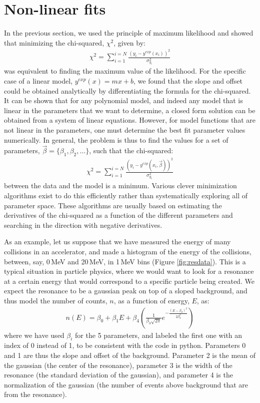 \section{Non-linear fits}
In the previous section, we used the principle of maximum likelihood and showed that minimizing the chi-squared, $\chi^2$, given by:
\begin{align}
\chi^2=\sum_{i=1}^{i=N}\frac{(y_i-y^{exp}(x_i))^2}{\sigma_{y_i}^2}
\end{align}
was equivalent to finding the maximum value of the likelihood. For the specific case of a linear  model, $y^{exp}(x)=mx+b$, we found that the slope and offset could be obtained analytically by differentiating the formula for the chi-squared. It can be shown that for any polynomial model, and indeed any model that is linear in the parameters that we want to determine, a closed form solution can be obtained from a system of linear equations. However, for model functions that are not linear in the parameters, one must determine the best fit parameter values numerically. In general, the problem is thus to find the values for a set of parameters, $\vec\beta=\{\beta_1, \beta_2,\dots\}$, such that the chi-squared:
\begin{align}
\chi^2=\sum_{i=1}^{i=N}\frac{(y_i-y^{exp}(x_i,\vec\beta))^2}{\sigma_{y_i}^2}
\end{align}
between the data and the model is a minimum. Various clever minimization algorithms exist to do this efficiently rather than systematically exploring all of parameter space. These algorithms are usually based on estimating the derivatives of the chi-squared as a function of the different parameters and searching in the direction with negative derivatives.

As an example, let us suppose that we have measured the energy of many collisions in an accelerator, and made a histogram of the energy of the collisions, between, say, 0\,MeV and 20\,MeV, in 1\,MeV bins (Figure \ref{fig:resdata}). This is a typical situation in particle physics, where we would want to  look for a resonance at a certain energy that would correspond to a specific particle being created. We expect the resonance to be a gaussian peak on top of a sloped background, and thus model the number of counts, $n$, as a function of energy, $E$, as:
\begin{align}
\label{eqn:resdataModel}
n(E)=\beta_0+\beta_1E+\beta_4\left( \frac{1}{\beta_3\sqrt{2\pi}}e^{-\frac{(E-\beta_2)^2}{2\beta_3^2}} \right)
\end{align}
where we have used $\beta_i$ for the 5 parameters, and labeled the first one with an index of 0 instead of 1, to be consistent with the code in python. Parameters 0 and 1 are thus the slope and offset of the background. Parameter 2 is the mean of the gaussian (the center of the resonance), parameter 3 is the width of the resonance (the standard deviation of the gaussian), and parameter 4 is the normalization of the gaussian (the number of events above background that are from the resonance). 

